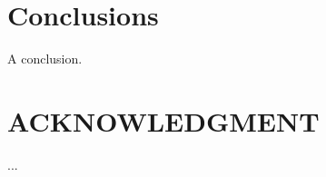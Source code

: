 \documentclass[letterpaper, 10 pt, conference]{ieeeconf}  %
\begin{document}
\section{Conclusions}

A conclusion.

\addtolength{\textheight}{-12cm}   %







%


\section*{ACKNOWLEDGMENT}

...






\end{document}
